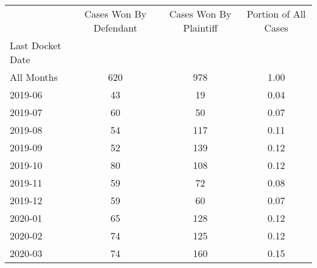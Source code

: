 \begin{tabular}{lccc}
\toprule
 & Cases Won By Defendant & Cases Won By Plaintiff & Portion of All Cases \\
Last Docket Date &  &  &  \\
\midrule
All Months & 620 & 978 & 1.00 \\
2019-06 & 43 & 19 & 0.04 \\
2019-07 & 60 & 50 & 0.07 \\
2019-08 & 54 & 117 & 0.11 \\
2019-09 & 52 & 139 & 0.12 \\
2019-10 & 80 & 108 & 0.12 \\
2019-11 & 59 & 72 & 0.08 \\
2019-12 & 59 & 60 & 0.07 \\
2020-01 & 65 & 128 & 0.12 \\
2020-02 & 74 & 125 & 0.12 \\
2020-03 & 74 & 160 & 0.15 \\
\bottomrule
\end{tabular}
